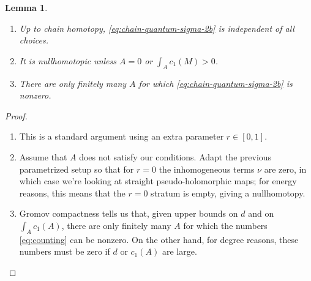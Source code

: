 \documentclass[JEP,XML,SOM,Unicode,NoFloatCountersInSection,published]{cedram}
\theoremstyle{plain}
\newtheorem{lemma}[theorem]{Lemma}
\theoremstyle{definition}
\begin{document}
\skpt
\begin{lemma} \label{th:gromov}
\begin{enumerate}
\item\label{th:gromovi}
Up to chain homotopy, \eqref{eq:chain-quantum-sigma-2b} is independent of all choices.

\item\label{th:gromovii}
It is nullhomotopic unless $A = 0$ or $\int_A c_1(M)>0$.

\item\label{th:gromoviii}
There are only finitely many $A$ for which \eqref{eq:chain-quantum-sigma-2b} is nonzero.
\end{enumerate}
\end{lemma}

\skpt
\begin{proof}
\begin{enumerate}
\item
This is a standard argument using an extra parameter $r \in [0,1]$.

\item
Assume that $A$ does not satisfy our conditions. Adapt the previous para\-me\-tri\-zed setup so that for $r = 0$ the inhomogeneous terms $\nu$ are zero, in which case we're looking at straight pseudo-holomorphic maps; for energy reasons, this means that the $r = 0$ stratum is empty, giving a nullhomotopy.

\item
Gromov compactness tells us that, given upper bounds on $d$ and on $\int_A c_1(A)$, there are only finitely many $A$ for which the numbers \eqref{eq:counting} can be nonzero. On the other hand, for degree reasons, these numbers must be zero if $d$ or $c_1(A)$ are large.\qedhere
\end{enumerate}
\end{proof}
\end{document}
